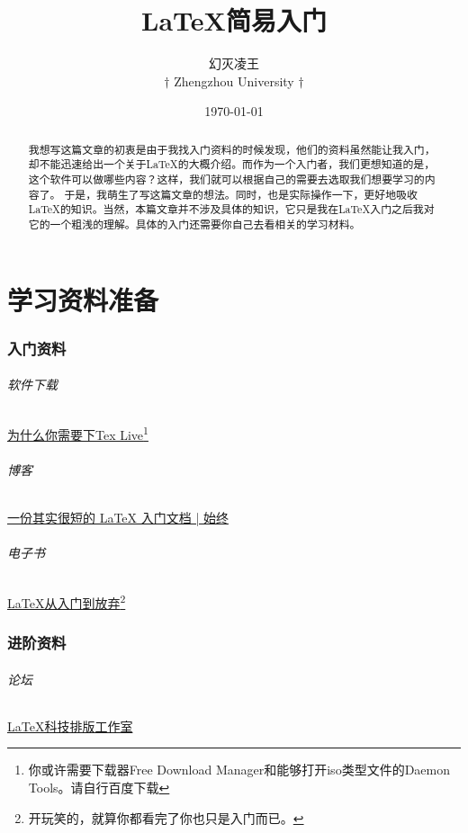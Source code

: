 \documentclass[UTF8,11pt,titlepage,a4paper]{ctexart}
\title{\LaTeX 简易入门}
\date{\today}
\author{ 幻灭凌王\\
	$ \dagger $ Zhengzhou University $ \dagger $}
\begin{document}
                                      
   \maketitle
   	\begin{abstract}
   	\qquad 我想写这篇文章的初衷是由于我找入门资料的时候发现，他们的资料虽然能让我入门，却不能迅速给出一个关于\LaTeX 的大概介绍。而作为一个入门者，我们更想知道的是，这个软件可以做哪些内容？这样，我们就可以根据自己的需要去选取我们想要学习的内容了。
   	于是，我萌生了写这篇文章的想法。同时，也是实际操作一下，更好地吸收\LaTeX 的知识。当然，本篇文章并不涉及具体的知识，它只是我在\LaTeX 入门之后我对它的一个粗浅的理解。具体的入门还需要你自己去看相关的学习材料。
   \end{abstract} 
	\setcounter{tocdepth}{4}
	\tableofcontents
	\newpage


	\part{学习资料准备}
	\section{入门资料}
	\paragraph{软件下载}\href{https://liam0205.me/texlive/
	}{为什么你需要下Tex Live}\footnote{你或许需要下载器Free Download Manager和能够打开iso类型文件的Daemon Tools。请自行百度下载}
	\paragraph{博客}\href{https://liam0205.me/2014/09/08/latex-introduction/}{一份其实很短的 LaTeX 入门文档 | 始终}
	\paragraph{电子书}\href{https://att.liam0205.me/attachment/LaTeX-useful-tools/LaTeX_Docs_2014.zip}{\LaTeX 从入门到放弃}\footnote{开玩笑的，就算你都看完了你也只是入门而已。}
	\section{进阶资料}
	\paragraph{论坛}\href{http://www.latexstudio.net/}{LaTeX科技排版工作室}
\end{document}
